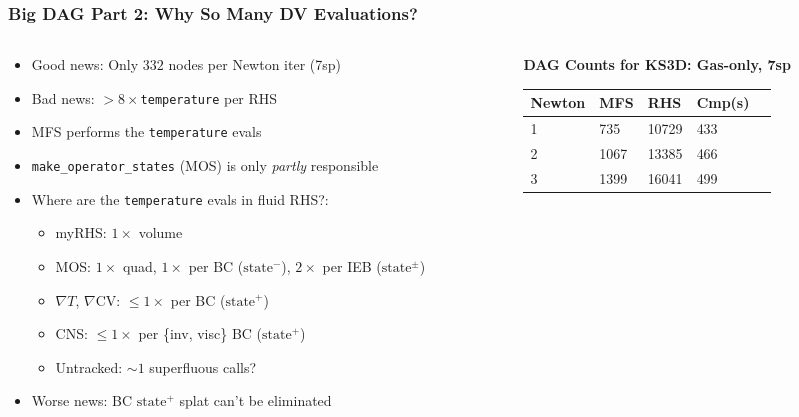 \begin{frame}\frametitle{Big DAG Part 2: Why So Many DV Evaluations?}
\begin{columns}[T, onlytextwidth] %
    \begin{column}{0.48\textwidth}
        \begin{itemize}
          \item Good news: Only $332$ nodes per Newton iter (7sp)
          \item Bad news: $>8\times$\texttt{temperature} per RHS
          \item MFS performs the \texttt{temperature} evals
          \item \texttt{make\_operator\_states} (MOS) is only \textit{partly} responsible
          \item Where are the \texttt{temperature} evals in fluid RHS?:
          \begin{itemize}
          \item myRHS: $1\times$ volume
          \item MOS: $1\times$ quad, $1\times$ per BC ($\text{state}^{-}$), $2\times$ per IEB ($\text{state}^{\pm}$)
          \item $\nabla{T}$, $\nabla{\text{CV}}$: $\le1\times$ per BC ($\text{state}^+$)
          \item CNS: $\le1\times$ per \{inv, visc\} BC ($\text{state}^+$)
          \item Untracked: $\sim1$ superfluous calls?
          \end{itemize}
          \item Worse news: BC $\text{state}^+$ splat can't be eliminated
        \end{itemize}
    \end{column}

    \begin{column}{0.48\textwidth}
        \centering
        \textbf{DAG Counts for KS3D: Gas-only, 7sp}\\
        \vspace{3pt}
        \begin{tabularx}{\textwidth}{|X|X|X|X|X|}
            \hline
            \textbf{Newton} & \textbf{MFS} & \textbf{RHS} & \textbf{Cmp(s)} \\ \hline
            1 & 735 & 10729 & 433 \\ \hline
            2 & 1067 & 13385 & 466 \\ \hline
            3 & 1399 & 16041 & 499 \\ \hline
        \end{tabularx}        
    \end{column}
\end{columns}

\end{frame}

